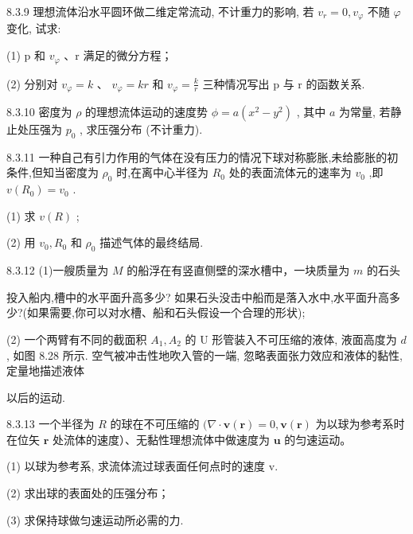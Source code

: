 \begin{problem}{8.3.9}
理想流体沿水平圆环做二维定常流动, 不计重力的影响, 若 $v_{r}=0, v_{\varphi}$ 不随 $\varphi$ 变化, 试求:

(1) p 和 $v_{\varphi}$ 、r 满足的微分方程；

(2) 分别对 $v_{\varphi}=k$ 、 $v_{\varphi}=kr$ 和 $v_{\varphi}=\frac{k}{r}$ 三种情况写出 p 与 r 的函数关系.
\end{problem}
\clearpage


\begin{problem}{8.3.10}
密度为 $\rho$ 的理想流体运动的速度势 $\phi = a(x^2 - y^2)$ , 其中 $a$ 为常量, 若静止处压强为 $p_0$ , 求压强分布 (不计重力).
\end{problem}
\clearpage


\begin{problem}{8.3.11}
一种自己有引力作用的气体在没有压力的情况下球对称膨胀,未给膨胀的初条件,但知当密度为 $\rho_0$ 时,在离中心半径为 $R_0$ 处的表面流体元的速率为 $v_0$ ,即 $v(R_0) = v_0$ .

(1) 求 $v(R)$ ;

(2) 用 $v_{0}, R_{0}$ 和 $\rho_{0}$ 描述气体的最终结局.
\end{problem}
\clearpage


\begin{problem}{8.3.12}
(1)一艘质量为 $M$ 的船浮在有竖直侧壁的深水槽中，一块质量为 $m$ 的石头

投入船内,槽中的水平面升高多少? 如果石头没击中船而是落入水中,水平面升高多少?(如果需要,你可以对水槽、船和石头假设一个合理的形状);

(2) 一个两臂有不同的截面积 $A_{1}, A_{2}$ 的 U 形管装入不可压缩的液体, 液面高度为 $d$ , 如图 8.28 所示. 空气被冲击性地吹入管的一端, 忽略表面张力效应和液体的黏性, 定量地描述液体

以后的运动.
\begin{center}

\end{center}
\end{problem}
\clearpage


\begin{problem}{8.3.13}
一个半径为 $R$ 的球在不可压缩的 $(\nabla \cdot \boldsymbol{v}(\boldsymbol{r}) = 0, \boldsymbol{v}(\boldsymbol{r})$ 为以球为参考系时在位矢 $\bm{r}$ 处流体的速度）、无黏性理想流体中做速度为 $\bm{u}$ 的匀速运动。

(1) 以球为参考系, 求流体流过球表面任何点时的速度 v.

(2) 求出球的表面处的压强分布；

(3) 求保持球做匀速运动所必需的力.
\begin{center}

\end{center}
\end{problem}
\clearpage


